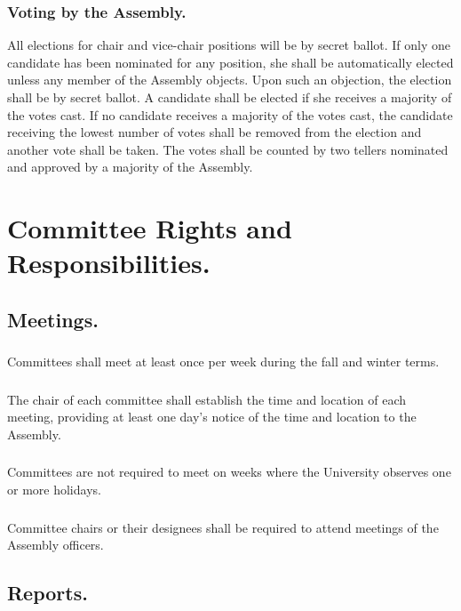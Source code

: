 \documentclass{rules}
\begin{document}
\subsubsection{Voting by the Assembly.}
\subsubsubsection{}
All elections for chair and vice-chair positions will be by secret ballot.  
\subsubsubsection{}
If only one candidate has been nominated for any position, she shall be automatically elected unless any member of the Assembly objects.  Upon such an objection, the election shall be by secret ballot.
\subsubsubsection{}
A candidate shall be elected if she receives a majority of the votes cast.
\subsubsubsection{}
If no candidate receives a majority of the votes cast, the candidate receiving the lowest number of votes shall be removed from the election and another vote shall be taken.
\subsubsubsection{}
The votes shall be counted by two tellers nominated and approved by a majority of the Assembly.


\section{Committee Rights and Responsibilities.}
\subsection{Meetings.}
\subsubsection{}
Committees shall meet at least once per week during the fall and winter terms.
\subsubsection{}
The chair of each committee shall establish the time and location of each meeting, providing at least one day's notice of the time and location to the Assembly.
\subsubsection{}
Committees are not required to meet on weeks where the University observes one or more holidays.
\subsubsection{}
Committee chairs or their designees shall be required to attend meetings of the Assembly officers.
\subsection{Reports.}
\end{document}
